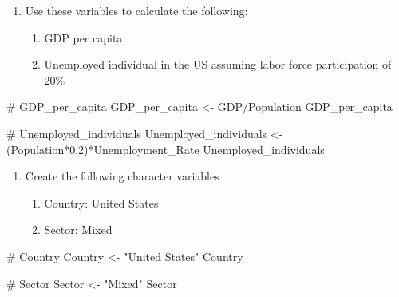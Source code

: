 \documentclass[
  letterpaper,
  DIV=11,
  numbers=noendperiod]{scrartcl}
\newenvironment{Shaded}{\begin{snugshade}}{\end{snugshade}}
\newcommand{\CommentTok}[1]{\textcolor[rgb]{0.37,0.37,0.37}{#1}}
\newcommand{\FloatTok}[1]{\textcolor[rgb]{0.68,0.00,0.00}{#1}}
\newcommand{\NormalTok}[1]{\textcolor[rgb]{0.00,0.23,0.31}{#1}}
\newcommand{\OtherTok}[1]{\textcolor[rgb]{0.00,0.23,0.31}{#1}}
\newcommand{\SpecialCharTok}[1]{\textcolor[rgb]{0.37,0.37,0.37}{#1}}
\newcommand{\StringTok}[1]{\textcolor[rgb]{0.13,0.47,0.30}{#1}}
\providecommand{\tightlist}{%
  \setlength{\itemsep}{0pt}\setlength{\parskip}{0pt}}\usepackage{longtable,booktabs,array}
\begin{document}
\begin{enumerate}
\def\labelenumi{\arabic{enumi}.}
\setcounter{enumi}{1}
\tightlist
\item
  Use these variables to calculate the following:

  \begin{enumerate}
  \def\labelenumii{\alph{enumii}.}
  \tightlist
  \item
    GDP per capita
  \item
    Unemployed individual in the US assuming labor force participation
    of 20\%
  \end{enumerate}
\end{enumerate}

\begin{Shaded}
\begin{Highlighting}[]
\CommentTok{\# GDP\_per\_capita}
\NormalTok{GDP\_per\_capita }\OtherTok{\textless{}{-}}\NormalTok{ GDP}\SpecialCharTok{/}\NormalTok{Population}
\NormalTok{GDP\_per\_capita    }

\CommentTok{\# Unemployed\_individuals}
\NormalTok{Unemployed\_individuals }\OtherTok{\textless{}{-}}\NormalTok{ (Population}\SpecialCharTok{*}\FloatTok{0.2}\NormalTok{)}\SpecialCharTok{*}\NormalTok{Unemployment\_Rate}
\NormalTok{Unemployed\_individuals}
\end{Highlighting}
\end{Shaded}

\begin{enumerate}
\def\labelenumi{\arabic{enumi}.}
\setcounter{enumi}{2}
\tightlist
\item
  Create the following character variables

  \begin{enumerate}
  \def\labelenumii{\alph{enumii}.}
  \tightlist
  \item
    Country: United States
  \item
    Sector: Mixed
  \end{enumerate}
\end{enumerate}

\begin{Shaded}
\begin{Highlighting}[]
\CommentTok{\# Country}
\NormalTok{Country }\OtherTok{\textless{}{-}} \StringTok{"United States"}
\NormalTok{Country}

\CommentTok{\# Sector}
\NormalTok{Sector }\OtherTok{\textless{}{-}} \StringTok{"Mixed"}
\NormalTok{Sector}
\end{Highlighting}
\end{Shaded}
\end{document}
